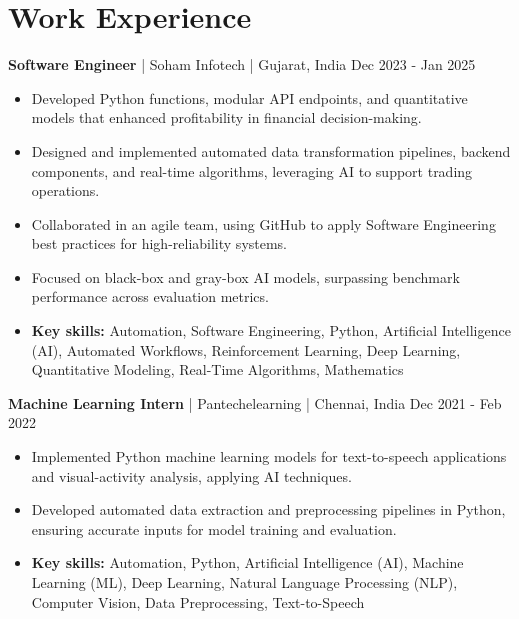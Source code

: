 \documentclass[a4paper,10pt]{article}
\begin{document}
\section*{Work Experience}
\textbf{Software Engineer} | Soham Infotech | Gujarat, India \hfill Dec 2023 - Jan 2025\par
\begin{itemize}
\item Developed Python functions, modular API endpoints, and quantitative models that enhanced profitability in financial decision-making.
\item Designed and implemented automated data transformation pipelines, backend components, and real-time algorithms, leveraging AI to support trading operations.
\item Collaborated in an agile team, using GitHub to apply Software Engineering best practices for high-reliability systems.
\item Focused on black-box and gray-box AI models, surpassing benchmark performance across evaluation metrics.
\item \textbf{Key skills:} Automation, Software Engineering, Python, Artificial Intelligence (AI), Automated Workflows, Reinforcement Learning, Deep Learning, Quantitative Modeling, Real-Time Algorithms, Mathematics
\end{itemize}
\vspace{3pt}
\textbf{Machine Learning Intern} | Pantechelearning | Chennai, India \hfill Dec 2021 - Feb 2022\par
\begin{itemize}
\item Implemented Python machine learning models for text-to-speech applications and visual-activity analysis, applying AI techniques.
\item Developed automated data extraction and preprocessing pipelines in Python, ensuring accurate inputs for model training and evaluation.
\item \textbf{Key skills:} Automation, Python, Artificial Intelligence (AI), Machine Learning (ML), Deep Learning, Natural Language Processing (NLP), Computer Vision, Data Preprocessing, Text-to-Speech
\end{itemize}
\vspace{3pt}
\end{document}
